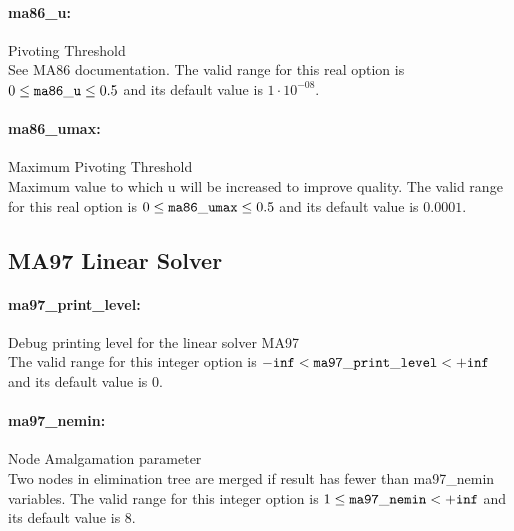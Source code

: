 \paragraph{ma86\_u:}\label{opt:ma86_u} Pivoting Threshold \\
 See MA86 documentation. The valid range for this real option is 
$0 \le {\tt ma86\_u } \le 0.5$
and its default value is $1 \cdot 10^{-08}$.


\paragraph{ma86\_umax:}\label{opt:ma86_umax} Maximum Pivoting Threshold \\
 Maximum value to which u will be increased to improve quality. The valid range for this real option is 
$0 \le {\tt ma86\_umax } \le 0.5$
and its default value is $0.0001$.


\subsection{MA97 Linear Solver}

\paragraph{ma97\_print\_level:}\label{opt:ma97_print_level} Debug printing level for the linear solver MA97 \\
 The valid range for this integer option is
${\tt -inf} <  {\tt ma97\_print\_level } <  {\tt +inf}$
and its default value is $0$.


\paragraph{ma97\_nemin:}\label{opt:ma97_nemin} Node Amalgamation parameter \\
 Two nodes in elimination tree are merged if result has fewer than ma97\_nemin variables. The valid range for this integer option is
$1 \le {\tt ma97\_nemin } <  {\tt +inf}$
and its default value is $8$.


